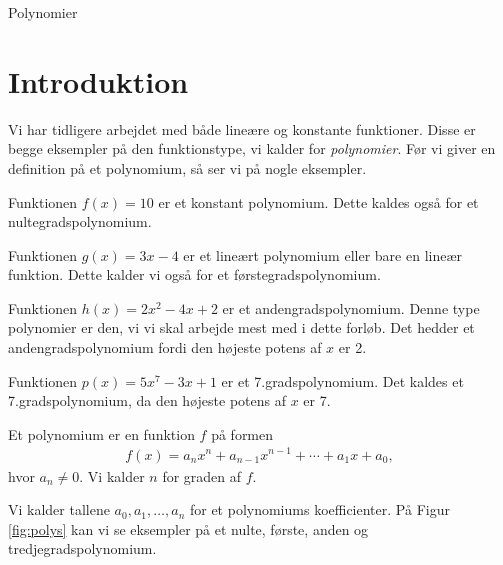 
\begin{center}
\Huge
Polynomier
\end{center}
\section*{Introduktion}

Vi har tidligere arbejdet med både lineære og konstante funktioner. Disse er begge eksempler på den funktionstype, vi kalder for \textit{polynomier}. Før vi giver en definition på et polynomium, så ser vi på nogle eksempler.

\begin{exa}
	Funktionen $f(x) = 10$ er et konstant polynomium. Dette kaldes også for et
	nultegradspolynomium.
\end{exa}
\begin{exa}
	Funktionen $g(x) = 3x-4$  er et lineært polynomium eller bare en lineær funktion. Dette 
	kalder vi også for et førstegradspolynomium.
\end{exa}
\begin{exa}
	Funktionen $h(x) = 2x^2-4x+2$ er et andengradspolynomium. Denne type polynomier er den, vi
	vi skal arbejde mest med i dette forløb. Det hedder et andengradspolynomium fordi 
	den højeste potens af $x$ er 2.
\end{exa}
\begin{exa}
	Funktionen $p(x) = 5x^7 -3x+1$ er et 7.gradspolynomium. Det kaldes et 7.gradspolynomium, da 
	den højeste potens af $x$ er 7.
\end{exa}

\begin{defn}
	Et polynomium er en funktion $f$ på formen
	\begin{align*}
		f(x) = a_nx^n+a_{n-1}x^{n-1}+\cdots+a_1 x + a_0,
	\end{align*}
	hvor $a_n \neq 0$. Vi kalder $n$ for graden af $f$. 
\end{defn}
Vi kalder tallene $a_0,a_1,\hdots,a_n$ for et polynomiums koefficienter. På Figur \ref{fig:polys} kan vi se eksempler på et nulte, første, anden og tredjegradspolynomium.

